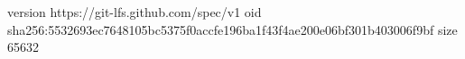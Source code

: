 version https://git-lfs.github.com/spec/v1
oid sha256:5532693ec7648105bc5375f0accfe196ba1f43f4ae200e06bf301b403006f9bf
size 65632
